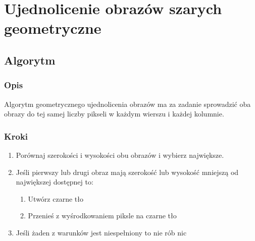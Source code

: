 \documentclass[a4paper,12pt]{book}
\begin{document}
\section{Ujednolicenie obrazów szarych geometryczne}
\subsection*{Algorytm}
\subsubsection*{Opis}
Algorytm geometrycznego ujednolicenia obrazów ma za zadanie sprowadzić oba obrazy do tej samej liczby pikseli w każdym wierszu i każdej kolumnie. 

\subsubsection*{Kroki}
\begin{enumerate}
	\item Porównaj szerokości i wysokości obu obrazów i wybierz największe. 
	\item Jeśli pierwszy lub drugi obraz mają szerokość lub wysokość mniejszą od największej dostępnej to:
	\begin{enumerate}
		\item Utwórz czarne tło
		\item Przenieś z wyśrodkowaniem piksle na czarne tło
	\end{enumerate}
	\item Jeśli żaden z warunków jest niespełniony to nie rób nic
\end{enumerate}
\end{document}
